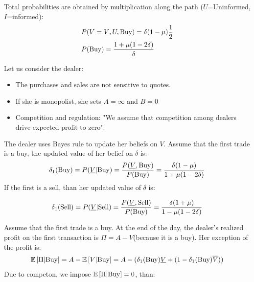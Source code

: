 Total probabilities are obtained by multiplication along the path ($U$=Uninformed, $I$=informed):
\begin{align*}
	&P(V = \text{\underline{$V$}}, U, \text{Buy}) = \delta (1 - \mu) \frac{1}{2}\\
	&P(\text{Buy}) = \frac{1 + \mu(1- 2 \delta)}{\delta}
\end{align*}

Let us consider the dealer:
\begin{itemize}
	\item The purchases and sales are not sensitive to quotes.
	\item If she is monopolist, she sets $A = \infty$  and $B = 0$
	\item Competition and regulation: "We assume that competition among dealers drive expected profit to zero".
\end{itemize}
The dealer uses Bayes rule to update her beliefs on $V$. Assume that the first trade is a buy, the updated value of her belief on $\delta$ is:
\[
\delta_1(\text{Buy}) = P (\text{\underline{$V$}}|\text{Buy}) = \frac{P(\text{\underline{$V$}},\text{Buy})}{P(\text{Buy})} = \frac{\delta(1 - \mu)}{1 + \mu(1-2\delta)}
\]
If the first is a sell, than her updated value of $\delta$ is:

\[
\delta_1(\text{Sell}) = P (\text{\underline{$V$}}|\text{Sell}) = \frac{P(\text{\underline{$V$}},\text{Sell})}{P(\text{Buy})} = \frac{\delta(1 + \mu)}{1 - \mu(1-2\delta)}
\]

Assume that the first trade is a buy. At the end of the day, the dealer's realized profit on the first transaction is $\Pi = A-V$(because it is a buy). Her exception of the profit is:
\[
\mathbb{E}\left[\Pi|\text{Buy}\right] = A - \mathbb{E}\left[V|\text{Buy}\right] = A - (\delta_1(\text{Buy}) \text{\underline{$V$}} + (1 - \delta_1(\text{Buy})\overline{V}))
\]
Due to competon, we impose $ \mathbb{E}\left[\Pi|\text{Buy}\right] = 0$, than:

